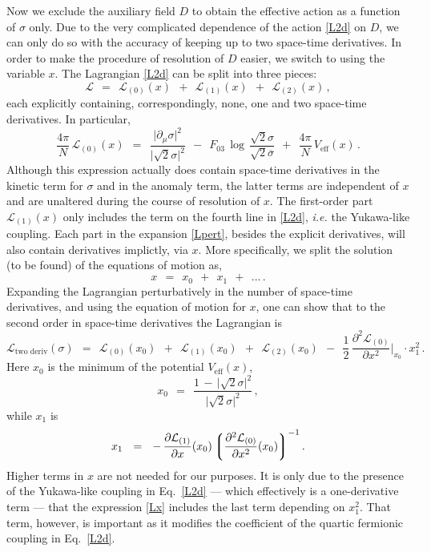 \documentclass[epsfig,12pt]{article}
\def\beq{\begin{equation}}
\def\eeq{\end{equation}}
\newcommand{\cell}{{\mathcal L}}
\newcommand{\p}{\partial}
\newcommand{\ov}{\overline}
\newcommand{\lgr}{\left\lgroup}
\newcommand{\rgr}{\right\rgroup}
\begin{document}
	Now we exclude the auxiliary field $ D $ to obtain the effective action 
	as a function of $ \sigma $ only.
	Due to the very complicated dependence of the action \eqref{L2d} on $ D $, we can only do so 
	with the accuracy of keeping up to two space-time derivatives.
	In order to make the procedure of resolution of $ D $ easier, we switch to using the variable $ x $.
	The Lagrangian \eqref{L2d} can be split into three pieces:
\beq
\label{Lpert}
	\cell    ~~=~~    \cell_{(0)}(x)    ~~+~~    \cell_{(1)}(x)    ~~+~~    \cell_{(2)}(x)\,,
\eeq
	each explicitly containing, correspondingly, none, one and two space-time derivatives.
	In particular, 
\beq
	\frac{4\pi}{N}\, \cell_{(0)}(x)    ~~=~~
	\frac{ \big|\p_\mu \sigma\big|^2 }
	{ \big|\sqrt{2}\sigma\big|^2 }
	~~-~~
	F_{03}\, \log\, \frac{\sqrt{2}\sigma}{\sqrt{2}\ov\sigma}
	~~+~~
	\frac{4\pi}{N}\, V_\text{eff}(x)\,.
\eeq
	Although this expression actually does contain space-time derivatives in the kinetic term for $ \sigma $
	and in the anomaly term, the latter terms are independent of $ x $ and are unaltered during the
	course of resolution of $ x $.
	The first-order part $ \cell_{(1)}(x) $ only includes the term 
	on the fourth line in \eqref{L2d}, {\it i.e.} the Yukawa-like coupling.
	Each part in the expansion \eqref{Lpert}, besides the explicit derivatives, will also contain derivatives
	implictly, via $ x $.
	More specifically, we split the solution (to be found) of the equations of motion as,
\beq
	x    ~~=~~    x_0    ~~+~~    x_1    ~~+~~    ...\,.
\eeq
	Expanding the Lagrangian perturbatively in the number of space-time derivatives, and using the equation of motion for $ x $,
	one can show that to the second order in space-time derivatives the Lagrangian is
\beq
\label{Lx}
	\cell_\text{two deriv}(\sigma)    ~~=~~    
		\cell_{(0)}(x_0)    ~~+~~    \cell_{(1)}(x_0)    ~~+~~    \cell_{(2)}(x_0)    
	~~-~~	\frac{1}{2}\, \frac{\p^2 \cell_{(0)}}{\p x^2}\bigg|_{x_0} \!\!\cdot x_1^2\,.
\eeq
	Here $ x_0 $ is the minimum of the potential $ V_\text{eff}(x) $, 
\beq
	x_0    ~~=~~    \frac{ 1 \,-\, \big|\sqrt{2}\sigma\big|^2 }{ \big|\sqrt{2}\sigma\big|^2 }\,,
\eeq
	while $ x_1 $ is
\beq
	x_1    ~~=~~    -\, \frac{\p \cell_{(1)}}{\p x}(x_0) \lgr \frac{\p^2 \cell_{(0)}}{\p x^2}(x_0)\rgr^{-1}.
\eeq
	Higher terms in $ x $ are not needed for our purposes.
	It is only due to the presence of the Yukawa-like coupling in Eq.~\eqref{L2d} --- which effectively is 
	a one-derivative term --- that the expression \eqref{Lx} includes the last term depending on $ x_1^2 $.
	That term, however, is important as it modifies the coefficient of the quartic fermionic coupling in Eq.~\eqref{L2d}.
\end{document}
